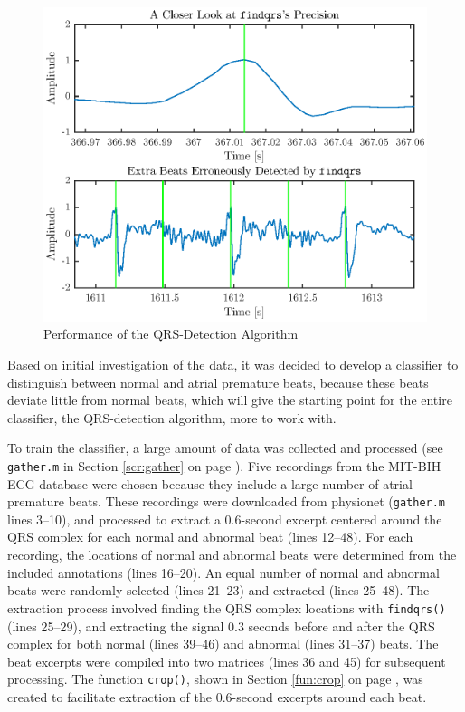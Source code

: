 \documentclass[12pt,letter]{article}
\newcommand{\rpref}[1]{\ref{#1} on page \pageref{#1}}
\begin{document}
\begin{figure}[hbtp]
    \centering
    \includegraphics[height=0.42\textheight]{../figures/figures_04}
    \caption{Performance of the QRS-Detection Algorithm}
    \label{fig:perf}
\end{figure}

Based on initial investigation of the data, it was decided to develop a
classifier to distinguish between normal and atrial premature beats, because
these beats deviate little from normal beats, which will give the starting point
for the entire classifier, the QRS-detection algorithm, more to work with.  

To train the classifier, a large amount of data was collected and processed (see
\verb`gather.m` in Section \rpref{scr:gather}).  Five recordings from the
MIT-BIH ECG database were chosen because they include a large number of atrial
premature beats.  These recordings were downloaded from physionet
(\verb`gather.m` lines 3--10), and processed to extract a 0.6-second excerpt
centered around the QRS complex for each normal and abnormal beat (lines
12--48).  For each recording, the locations of normal and abnormal beats were
determined from the included annotations (lines 16--20).  An equal number of
normal and abnormal beats were randomly selected (lines 21--23) and extracted
(lines 25--48).  The extraction process involved finding the QRS complex
locations with \verb`findqrs()` (lines 25--29), and extracting the signal 0.3
seconds before and after the QRS complex for both normal (lines 39--46) and
abnormal (lines 31--37) beats.  The beat excerpts were compiled into two
matrices (lines 36 and 45) for subsequent processing.  The function
\verb`crop()`, shown in Section \rpref{fun:crop}, was created to facilitate
extraction of the 0.6-second excerpts around each beat.  
\end{document}
